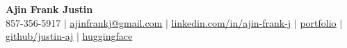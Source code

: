 \begin{center}
    \textbf{\Huge Ajin Frank Justin} \\
    \vspace{1pt}
    857-356-5917 $|$ 
    \href{mailto:ajinfrankj@gmail.com}{\underline{ajinfrankj@gmail.com}} $|$ 
    \href{https://www.linkedin.com/in/ajin-frank-j/}{\underline{linkedin.com/in/ajin-frank-j}} $|$ 
    \href{https://ajinfrankjustin.sites.northeastern.edu/}{\underline{portfolio}} $|$ 
    \href{https://github.com/justin-aj}{\underline{github/justin-aj}} $|$ 
    \href{https://huggingface.co/justin-aj}{\underline{huggingface}}
    
\end{center}

\vspace{-15pt}  %
